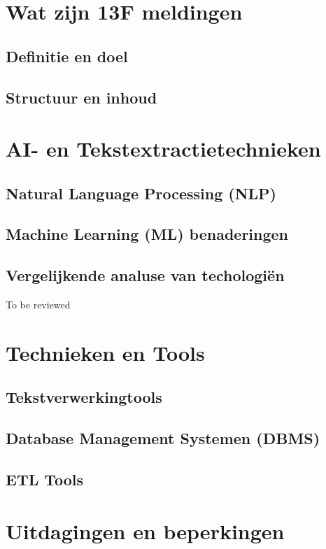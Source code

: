 \section{Wat zijn 13F meldingen}
\subsection{Definitie en doel}
\subsection{Structuur en inhoud}
\section{AI- en Tekstextractietechnieken}
\subsection{Natural Language Processing (NLP)}
\subsection{Machine Learning (ML) benaderingen}
\subsection{Vergelijkende analuse van techologiën}
To be reviewed
\section{Technieken en Tools}
\subsection{Tekstverwerkingtools}
\subsection{Database Management Systemen (DBMS)}
\subsection{ETL Tools}
\section{Uitdagingen en beperkingen}
